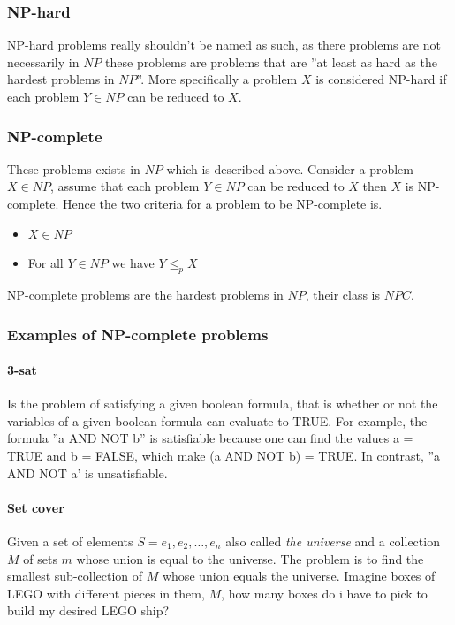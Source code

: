 \documentclass[12pt]{article} %
\begin{document}
\subsubsection{NP-hard}
NP-hard problems really shouldn't be named as such, as there problems are not necessarily in $NP$ these problems are problems that are ''at least as hard as the hardest problems in $NP$''. More specifically a problem $X$ is considered NP-hard if each problem $Y \in NP$ can be reduced to $X$.

\subsubsection{NP-complete}
These problems exists in $NP$ which is described above. Consider a problem $X \in NP$, assume that each problem $Y \in NP$ can be reduced to $X$ then $X$ is NP-complete. Hence the two criteria for a problem to be NP-complete is.
\begin{itemize}
    \item $X \in NP$
    \item For all $Y \in NP$ we have $Y \leq_{p} X$
\end{itemize}
NP-complete problems are the hardest problems in $NP$, their class is $NPC$.

\subsubsection{Examples of NP-complete problems}

\paragraph{3-sat}
Is the problem of satisfying a given boolean formula, that is whether or not the variables of a given boolean formula can evaluate to TRUE. For example, the formula ''a AND NOT b'' is satisfiable because one can find the values a = TRUE and b = FALSE, which make (a AND NOT b) = TRUE. In contrast, ''a AND NOT a' is unsatisfiable.

\paragraph{Set cover}
Given a set of elements $S = {e_{1}, e_{2}, \dots, e_{n}}$ also called \textit{the universe} and a collection $M$ of sets $m$ whose union is equal to the universe. The problem is to find the smallest sub-collection of $M$ whose union equals the universe. Imagine boxes of LEGO with different pieces in them, $M$, how many boxes do i have to pick to build my desired LEGO ship?
\end{document}
